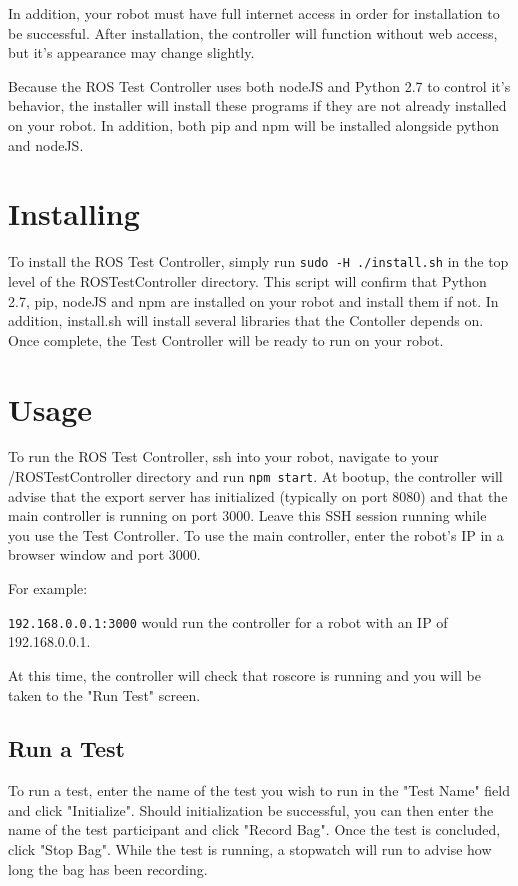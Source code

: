 \documentclass[onecolumn, draftclsnofoot,10pt, compsoc]{report}
\begin{document}
In addition, your robot must have full internet access in order for installation to be successful. After installation, the controller will function without web access, but it's appearance may change slightly.

Because the ROS Test Controller uses both nodeJS and Python 2.7 to control it's behavior, the installer will install these programs if they are not already installed on your robot. In addition, both pip and npm will be installed alongside python and nodeJS.
\section{Installing}

To install the ROS Test Controller, simply run \texttt{sudo -H ./install.sh} in the top level of the ROSTestController directory. This script will confirm that Python 2.7, pip, nodeJS and npm are installed on your robot and install them if not. In addition, install.sh will install several libraries that the Contoller depends on. Once complete, the Test Controller will be ready to run on your robot.
\section{Usage}

To run the ROS Test Controller, ssh into your robot, navigate to your /ROSTestController directory and run \texttt{npm start}. At bootup, the controller will advise that the export server has initialized (typically on port 8080) and that the main controller is running on port 3000. Leave this SSH session running while you use the Test Controller. To use the main controller, enter the robot's IP in a browser window and port 3000.

For example:

\texttt{192.168.0.0.1:3000} would run the controller for a robot with an IP of 192.168.0.0.1.

At this time, the controller will check that roscore is running and you will be taken to the "Run Test" screen.
\subsection{Run a Test}

To run a test, enter the name of the test you wish to run in the "Test Name" field and click "Initialize". Should initialization be successful, you can then enter the name of the test participant and click "Record Bag". Once the test is concluded, click "Stop Bag". While the test is running, a stopwatch will run to advise how long the bag has been recording.
\end{document}

